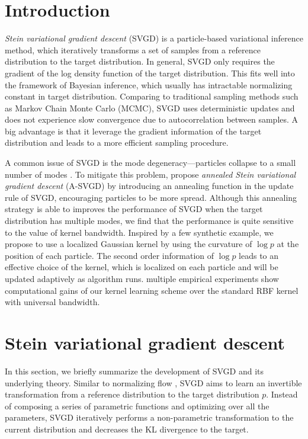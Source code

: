 \section{Introduction} \label{sec:intro}

\emph{Stein variational gradient descent} (SVGD) \citep{liu2016stein} is a particle-based variational inference method, which iteratively transforms a set of samples from a reference distribution to the target distribution. In general, SVGD only requires the gradient of the log density function of the target distribution. This fits well into the framework of Bayesian inference, which usually has intractable normalizing constant in target distribution.   Comparing to traditional sampling methods such as Markov Chain Monte Carlo (MCMC), SVGD uses deterministic updates and does not experience slow convergence due to autocorrelation between samples. A big advantage is that it leverage the gradient information of the target distribution and leads to a more efficient sampling procedure.

A common issue of SVGD is the mode degeneracy---particles  collapse to a small number of modes \citet{zhuo2018message}. To mitigate this problem, \citet{d2021annealed} propose \emph{annealed Stein variational gradient descent} (A-SVGD) by introducing an annealing function in the update rule of SVGD, encouraging particles to be more spread.  Although this annealing strategy is able to improves the performance of SVGD when the target distribution has multiple modes, we find that the performance is quite sensitive to the value of kernel bandwidth. 
Inspired by a few synthetic example, we propose to use a localized Gaussian kernel by using the curvature of $\log p$ at the position of each particle. 
The second order information of $\log p$ leads to an effective choice of the kernel, which is localized on each particle and will be updated adaptively as algorithm runs. 
multiple empirical experiments show computational gains of our kernel learning scheme over the standard RBF kernel with universal bandwidth.





\section{Stein variational gradient descent} \label{sec:summary}
In this section, we briefly summarize the development of SVGD  and its underlying theory.
Similar to normalizing flow \citep{kobyzev2020normalizing}, SVGD aims to learn an invertible transformation from a reference distribution to the target distribution $p$.
Instead of composing a series of parametric functions and optimizing over all the parameters, SVGD iteratively performs a non-parametric transformation to the current distribution and decreases the KL divergence to the target.

